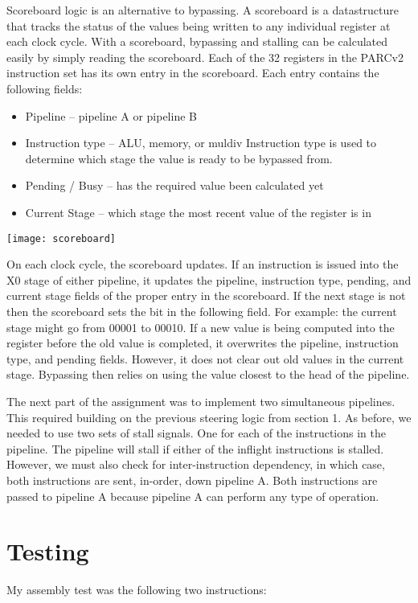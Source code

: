 \documentclass[a4paper, 12pt]{article}
\begin{document}
Scoreboard logic is an alternative to bypassing. A scoreboard is a datastructure that tracks the status of the values being written to any individual register at each clock cycle. With a scoreboard, bypassing and stalling can be calculated easily by simply reading the scoreboard. Each of the 32 registers in the PARCv2 instruction set has its own entry in the scoreboard. Each entry contains the following fields: 
\begin{itemize}
\item Pipeline -- pipeline A or pipeline B
\item Instruction type -- ALU, memory, or muldiv
Instruction type is used to determine which stage the value is ready to be bypassed from.

\item Pending / Busy -- has the required value been calculated yet
\item Current Stage -- which stage the most recent value of the register is in
\end{itemize}

\texttt{[image: scoreboard]}

On each clock cycle, the scoreboard updates. If an instruction is issued into the X0 stage of either pipeline, it updates the pipeline, instruction type, pending, and current stage fields of the proper entry in the scoreboard. If the next stage is not then the scoreboard sets the bit in the following field. For example: the current stage might go from 00001 to 00010. If a new value is being computed into the register before the old value is completed, it overwrites the pipeline, instruction type, and pending fields. However, it does not clear out old values in the current stage. Bypassing then relies on using the value closest to the head of the pipeline. 

The next part of the assignment was to implement two simultaneous pipelines. This required building on the previous steering logic from section 1. As before, we needed to use two sets of stall signals. One for each of the instructions in the pipeline. The pipeline will stall if either of the inflight instructions is stalled. However, we must also check for inter-instruction dependency, in which case, both instructions are sent, in-order, down pipeline A. Both instructions are passed to pipeline A because pipeline A can perform any type of operation. 


\section{Testing}
My assembly test was the following two instructions:
\end{document}
